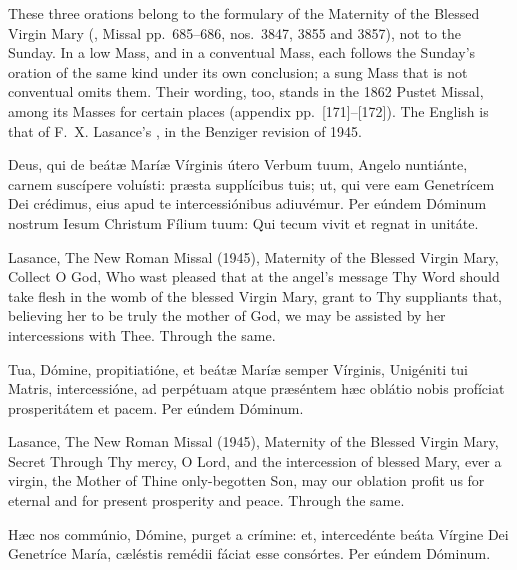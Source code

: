 These three orations belong to the formulary of the Maternity of the Blessed
Virgin Mary (, Missal pp.~685--686, nos.~3847, 3855 and
3857), not to the Sunday. In a low Mass, and in a conventual Mass, each follows
the Sunday's oration of the same kind under its own conclusion; a sung Mass that
is not conventual omits them. Their wording, too, stands in the 1862 Pustet
Missal, among its Masses for certain places (appendix pp.~[171]--[172]). The
English is that of F.~X. Lasance's , in the
Benziger revision of 1945.

\begin{latinproper}
Deus, qui de beátæ Maríæ Vírginis útero Verbum tuum, Angelo nuntiánte, carnem
suscípere voluísti: præsta supplícibus tuis; ut, qui vere eam Genetrícem Dei
crédimus, eius apud te intercessiónibus adiuvémur. Per eúndem Dóminum nostrum
Iesum Christum Fílium tuum: Qui tecum vivit et regnat in unitáte.
\end{latinproper}

\begin{englishwitness}{Lasance, The New Roman Missal (1945), Maternity of the Blessed Virgin Mary, Collect}
O God, Who wast pleased that at the angel's message Thy Word should take flesh
in the womb of the blessed Virgin Mary, grant to Thy suppliants that, believing
her to be truly the mother of God, we may be assisted by her intercessions with
Thee. Through the same.
\end{englishwitness}

\begin{latinproper}
Tua, Dómine, propitiatióne, et beátæ Maríæ semper Vírginis, Unigéniti tui
Matris, intercessióne, ad perpétuam atque præséntem hæc oblátio nobis
profíciat prosperitátem et pacem. Per eúndem Dóminum.
\end{latinproper}

\begin{englishwitness}{Lasance, The New Roman Missal (1945), Maternity of the Blessed Virgin Mary, Secret}
Through Thy mercy, O Lord, and the intercession of blessed Mary, ever a virgin,
the Mother of Thine only-begotten Son, may our oblation profit us for eternal
and for present prosperity and peace. Through the same.
\end{englishwitness}

\begin{latinproper}
Hæc nos commúnio, Dómine, purget a crímine: et, intercedénte beáta Vírgine Dei
Genetríce María, cæléstis remédii fáciat esse consórtes. Per eúndem Dóminum.
\end{latinproper}

